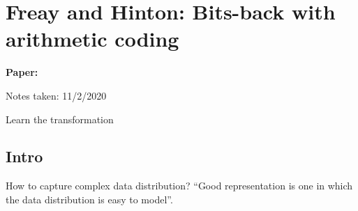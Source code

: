 \clearpage

\section{Freay and Hinton: Bits-back with arithmetic coding}\label{sec:arithmeticbitsback}

\begin{notebox}
\textbf{Paper: } 

\hfill Notes taken: 11/2/2020 
\end{notebox}

\begin{notebox}
\tldr Learn the transformation 
\end{notebox}

\subsection{Intro}


How to capture complex data distribution?
``Good representation is one in which the data distribution is easy to model''.


